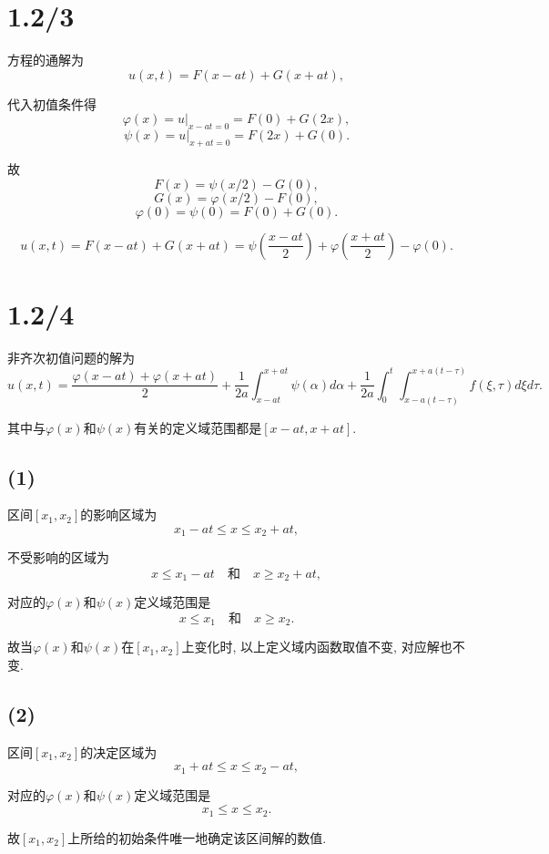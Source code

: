 \documentclass[11pt,a4paper]{article}
\author{刘逸灏 (515370910207)}
\begin{document}
\maketitle

\section{1.2/3}

方程的通解为
$$u(x,t)=F(x-at)+G(x+at),$$

代入初值条件得
$$\varphi(x)=u|_{x-at=0}=F(0)+G(2x),$$
$$\psi(x)=u|_{x+at=0}=F(2x)+G(0).$$

故
$$F(x)=\psi(x/2)-G(0),$$
$$G(x)=\varphi(x/2)-F(0),$$
$$\varphi(0)=\psi(0)=F(0)+G(0).$$

$$u(x,t)=F(x-at)+G(x+at)=\psi\left(\frac{x-at}{2}\right)+\varphi\left(\frac{x+at}{2}\right)-\varphi(0).$$

\section{1.2/4}

非齐次初值问题的解为
$$u(x,t)=\frac{\varphi(x-at)+\varphi(x+at)}{2}+\frac{1}{2a}\int_{x-at}^{x+at}\psi(\alpha)d\alpha+\frac{1}{2a}\int_0^t\int_{x-a(t-\tau)}^{x+a(t-\tau)}f(\xi,\tau)d\xi d\tau.$$

其中与$\varphi(x)$和$\psi(x)$有关的定义域范围都是$[x-at,x+at]$.

\subsection*{(1)}
区间$[x_1,x_2]$的影响区域为$$x_1-at\leqslant x\leqslant x_2+at,$$

不受影响的区域为$$x\leqslant x_1-at\quad\text{和}\quad x\geqslant x_2+at,$$

对应的$\varphi(x)$和$\psi(x)$定义域范围是$$x\leqslant x_1\quad\text{和}\quad x\geqslant x_2.$$

故当$\varphi(x)$和$\psi(x)$在$[x_1,x_2]$上变化时, 以上定义域内函数取值不变, 对应解也不变.

\subsection*{(2)}

区间$[x_1,x_2]$的决定区域为$$x_1+at\leqslant x\leqslant x_2-at,$$

对应的$\varphi(x)$和$\psi(x)$定义域范围是$$x_1\leqslant x\leqslant x_2.$$

故$[x_1,x_2]$上所给的初始条件唯一地确定该区间解的数值.
\end{document}
